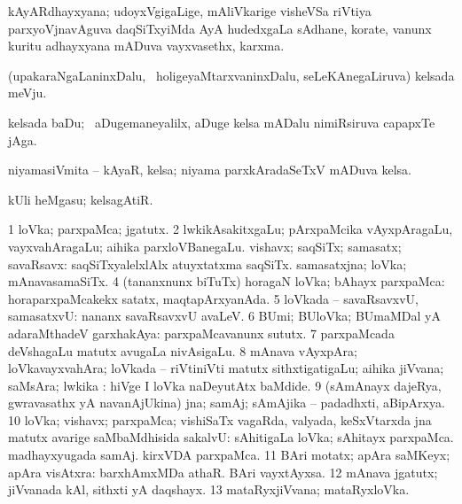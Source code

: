 {{{{{{\begin{center}
\bentry
{} 
\gl{\nA}
\expl{}
\bmng
kAyARdhayxyana; udoyxVgigaLige, mAliVkarige visheVSa riVtiya parxyoVjnavAguva daqSiTxyiMda AyA hudedxgaLa sAdhane, korate, \mo vanunx kuritu adhayxyana mADuva vayxvasethx, karxma. 
\emng
\eentry

\bentry
{} 
\gl{\nA}
\expl{}
\bmng
(upakaraNgaLaninxDalu, \kanmu\ holigeyaMtarxvaninxDalu, seLeKAnegaLiruva) kelsada meVju. 
\emng
\eentry

\bentry
{} 
\gl{\nA}
\expl{}
\bmng
kelsada baDu; \kanmu\ aDugemaneyalilx, aDuge kelsa mADalu nimiRsiruva capapxTe jAga. 
\emng
\eentry

\bentry
{} 
\gl{\nA}
\expl{}
\bmng
niyamasiVmita -- kAyaR, kelsa; niyama parxkAradaSeTxV mADuva kelsa. 
\emng
\eentry

\bentry
{} 
\gl{\nA}
\bmng
kUli heMgasu; kelsagAtiR. 
\emng
\eentry

\bentry
{} 
\gl{\nA}
\expl{}
\bmng
% 
\bnum
\num{1} loVka; parxpaMca; jgatutx. 
\num{2} lwkikAsakitxgaLu; pArxpaMcika vAyxpAragaLu, vayxvahAragaLu; aihika parxloVBanegaLu. 
\banum
{} vishavx; saqSiTx; samasatx; savaRsavx:  saqSiTxyalelxlAlx atuyxtatxma saqSiTx. 
 samasatxjna; loVka; mAnavasamaSiTx. 
\eanum
\numie
\num{4} (tananxnunx biTuTx) horagaN loVka; bAhayx parxpaMca:  horaparxpaMcakekx satatx, maqtapArxyanAda. 
\num{5} loVkada -- savaRsavxvU, samasatxvU:  nananx savaRsavxvU avaLeV. 
\num{6} BUmi; BUloVka; BUmaMDal yA adaraMthadeV garxhakAya:  parxpaMcavanunx sututx. 
\num{7} parxpaMcada deVshagaLu matutx avugaLa nivAsigaLu. 
\num{8} mAnava vAyxpAra; loVkavayxvahAra; loVkada -- riVtiniVti matutx sithxtigatigaLu; aihika jiVvana; saMsAra; lwkika :  hiVge I loVka naDeyutAtx baMdide. 
\num{9} (sAmAnayx dajeRya, gwravasathx yA navanAjUkina) jna; samAj; sAmAjika -- padadhxti, aBipArxya. 
\num{10} loVka; vishavx; parxpaMca; vishiSaTx vagaRda, valyada, keSxVtarxda jna matutx avarige saMbaMdhisida sakalvU:  sAhitigaLa loVka; sAhitayx parxpaMca.  madhayxyugada samAj.  kirxVDA parxpaMca. 
\num{11} BAri motatx; apAra saMKeyx; apAra visAtxra:  barxhAmxMDa athaR.  BAri vayxtAyxsa. 
\num{12} mAnava jgatutx; jiVvanada kAl, sithxti yA daqshayx. 
\num{13} mataRyxjiVvana; mataRyxloVka. 
\enum
\emng


\end{center}}}}}}}
